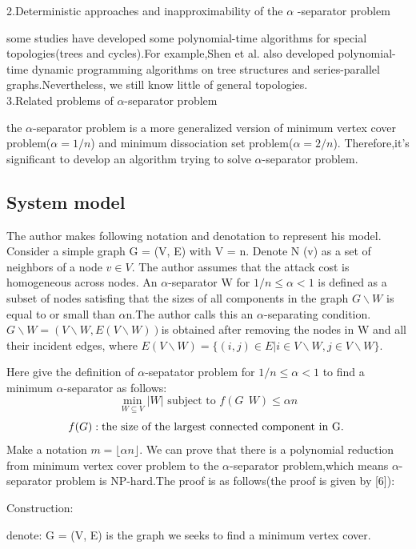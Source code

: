 \documentclass[10pt,journal]{IEEEtran}
\begin{document}
2.Deterministic approaches and inapproximability of the $\alpha$ -separator
problem

some studies have developed some polynomial-time algorithms for special topologies(trees and cycles).For example,Shen et al.
also developed polynomial-time dynamic programming algorithms on
tree structures and series-parallel graphs.Nevertheless, we still know little of general topologies.\\

3.Related problems of $\alpha$-separator problem

the $\alpha$-separator problem is a more generalized
version of minimum vertex cover problem($\alpha = 1/n$) and minimum dissociation set problem($\alpha = 2/n$).
Therefore,it's significant to develop an algorithm trying to solve $\alpha$-separator problem.

\subsection{System model}

The author makes following notation and denotation to represent his model.
Consider a simple graph G = (V, E) with V = n. Denote
N (v) as a set of neighbors of a node $v\in V$. The author assumes that the attack
cost is homogeneous across nodes. An $\alpha$-separator W for $1/n\leq\alpha<1$ is defined as a subset of nodes satisfing that the sizes of all components in the graph $G \backslash W$ is equal to or small than $\alpha$n.The author calls this an $\alpha$-separating condition.
$G\backslash W = (V\backslash W, E (V\backslash W)) $is obtained after removing the nodes in W and
all their incident edges, where $ E (V\backslash W) = \{(i, j) \in E| i \in V\backslash W ,j \in V\backslash W \}.$

Here give the definition of $\alpha$-sepatator problem for $1/n\leq \alpha < 1 $ to find a minimum $\alpha$-separator as follows:
$$\min\limits_{W\subseteq V}|W| \mbox{ subject to }f(G \
\ W) \leq \alpha n$$ 
 $$f(G) : \mbox{the size of the largest } \\
 \mbox{connected component in G. }$$
Make a notation $ m = \lfloor \alpha n \rfloor$.
We can prove that there is a polynomial reduction from minimum vertex cover problem to the $\alpha$-separator problem,which means $\alpha$-separator problem is NP-hard.The proof is as follows(the proof is given by [6]):


Construction:

denote: G = (V, E) is the graph we seeks to find a minimum vertex cover. 
\end{document}
